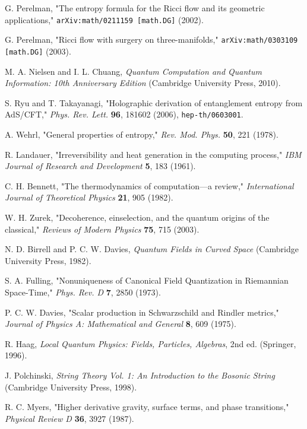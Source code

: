 \documentclass[11pt, letterpaper]{report}
\theoremstyle{plain} %
\theoremstyle{definition} %
\theoremstyle{remark} %
\begin{document}
\begin{thebibliography}{99}
G. Perelman, "The entropy formula for the Ricci flow and its geometric applications," \texttt{arXiv:math/0211159 [math.DG]} (2002).

G. Perelman, "Ricci flow with surgery on three-manifolds," \texttt{arXiv:math/0303109 [math.DG]} (2003).

\label{NielsenChuang2010}
M. A. Nielsen and I. L. Chuang, \textit{Quantum Computation and Quantum Information: 10th Anniversary Edition} (Cambridge University Press, 2010).

S. Ryu and T. Takayanagi, "Holographic derivation of entanglement entropy from AdS/CFT," \textit{Phys. Rev. Lett.} \textbf{96}, 181602 (2006), \texttt{hep-th/0603001}.

A. Wehrl, "General properties of entropy," \textit{Rev. Mod. Phys.} \textbf{50}, 221 (1978).

\label{Landauer1961}
R. Landauer, "Irreversibility and heat generation in the computing process," \textit{IBM Journal of Research and Development} \textbf{5}, 183 (1961).

C. H. Bennett, "The thermodynamics of computation—a review," \textit{International Journal of Theoretical Physics} \textbf{21}, 905 (1982).

W. H. Zurek, "Decoherence, einselection, and the quantum origins of the classical," \textit{Reviews of Modern Physics} \textbf{75}, 715 (2003).

N. D. Birrell and P. C. W. Davies, \textit{Quantum Fields in Curved Space} (Cambridge University Press, 1982).

S. A. Fulling, "Nonuniqueness of Canonical Field Quantization in Riemannian Space-Time," \textit{Phys. Rev. D} \textbf{7}, 2850 (1973).

P. C. W. Davies, "Scalar production in Schwarzschild and Rindler metrics," \textit{Journal of Physics A: Mathematical and General} \textbf{8}, 609 (1975).

R. Haag, \textit{Local Quantum Physics: Fields, Particles, Algebras}, 2nd ed. (Springer, 1996).

J. Polchinski, \textit{String Theory Vol. 1: An Introduction to the Bosonic String} (Cambridge University Press, 1998).

R. C. Myers, "Higher derivative gravity, surface terms, and phase transitions," \textit{Physical Review D} \textbf{36}, 3927 (1987).


\end{thebibliography}
\end{document}
